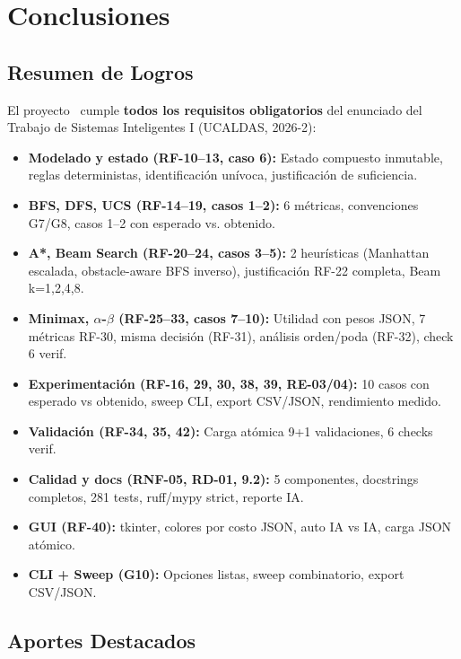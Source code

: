 \chapter{Conclusiones}
\label{ch:conclusiones}

\section{Resumen de Logros}
\label{sec:logros}

El proyecto \tacticalgrid\ cumple \textbf{todos los requisitos obligatorios} del enunciado del
Trabajo de Sistemas Inteligentes I (UCALDAS, 2026-2):

\begin{itemize}
\item \textbf{Modelado y estado (RF-10--13, caso 6):} Estado compuesto inmutable, reglas
  deterministas, identificación unívoca, justificación de suficiencia.
\item \textbf{BFS, DFS, UCS (RF-14--19, casos 1--2):} 6 métricas, convenciones G7/G8,
  casos 1--2 con esperado vs. obtenido.
\item \textbf{A*, Beam Search (RF-20--24, casos 3--5):} 2 heurísticas (Manhattan escalada,
  obstacle-aware BFS inverso), justificación RF-22 completa, Beam k=1,2,4,8.
\item \textbf{Minimax, $\alpha$-$\beta$ (RF-25--33, casos 7--10):} Utilidad con pesos JSON,
  7 métricas RF-30, misma decisión (RF-31), análisis orden/poda (RF-32), check 6 verif.
\item \textbf{Experimentación (RF-16, 29, 30, 38, 39, RE-03/04):} 10 casos con esperado vs
  obtenido, sweep CLI, export CSV/JSON, rendimiento medido.
\item \textbf{Validación (RF-34, 35, 42):} Carga atómica 9+1 validaciones, 6 checks verif.
\item \textbf{Calidad y docs (RNF-05, RD-01, 9.2):} 5 componentes, docstrings completos,
  281 tests, ruff/mypy strict, reporte IA.
\item \textbf{GUI (RF-40):} tkinter, colores por costo JSON, auto IA vs IA, carga JSON atómico.
\item \textbf{CLI + Sweep (G10):} Opciones listas, sweep combinatorio, export CSV/JSON.
\end{itemize}

\section{Aportes Destacados}
\label{sec:aportes}

